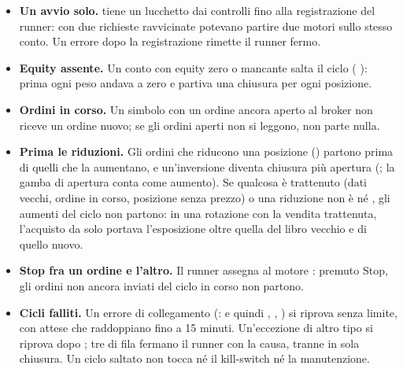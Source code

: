 \begin{itemize}
  \item \textbf{Un avvio solo.}  tiene un lucchetto dai
        controlli fino alla registrazione del runner: con due richieste
        ravvicinate potevano partire due motori sullo stesso conto. Un
        errore dopo la registrazione rimette il runner fermo.
  \item \textbf{Equity assente.} Un conto con equity zero o mancante salta
        il ciclo ( ): prima
        ogni peso andava a zero e partiva una chiusura per ogni posizione.
  \item \textbf{Ordini in corso.} Un simbolo con un ordine ancora aperto al
        broker non riceve un ordine nuovo; se gli ordini aperti non si
        leggono, non parte nulla.
  \item \textbf{Prima le riduzioni.} Gli ordini che riducono una posizione
        () partono prima di quelli che la aumentano, e
        un'inversione diventa chiusura più apertura
        (; la gamba di apertura conta come
        aumento). Se qualcosa è trattenuto (dati vecchi, ordine in corso,
        posizione senza prezzo) o una riduzione non è  né
        , gli aumenti del ciclo non partono: in una rotazione
        con la vendita trattenuta, l'acquisto da solo portava l'esposizione
        oltre quella del libro vecchio e di quello nuovo.
  \item \textbf{Stop fra un ordine e l'altro.} Il runner assegna al motore
        : premuto Stop, gli ordini non ancora inviati
        del ciclo in corso non partono.
  \item \textbf{Cicli falliti.} Un errore di collegamento
        (:  e quindi
        , ,
        ) si riprova senza limite, con attese che
        raddoppiano fino a \num{15} minuti. Un'eccezione di altro tipo si
        riprova dopo ; tre di fila fermano il runner
        con la causa, tranne in sola chiusura. Un ciclo saltato non tocca né
        il kill-switch né la manutenzione.
\end{itemize}

